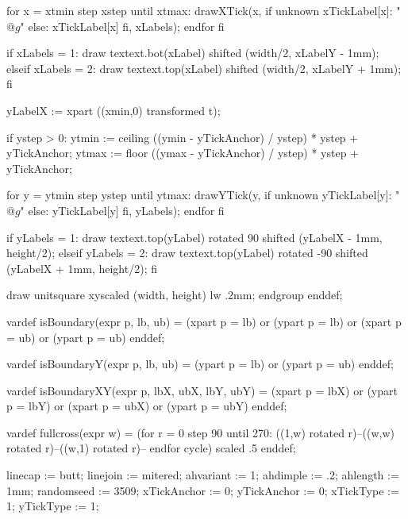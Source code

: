     for x = xtmin step xstep until xtmax:
      drawXTick(x, if unknown xTickLabel[x]: "$@g$" else: xTickLabel[x] fi, xLabels);
    endfor
  fi

  if xLabels = 1:
    draw textext.bot(xLabel) shifted (width/2, xLabelY - 1mm);
  elseif xLabels = 2:
    draw textext.top(xLabel) shifted (width/2, xLabelY + 1mm);
  fi

  yLabelX := xpart ((xmin,0) transformed t);

  if ystep > 0:
    ytmin := ceiling ((ymin - yTickAnchor) / ystep) * ystep + yTickAnchor;
    ytmax := floor ((ymax - yTickAnchor) / ystep) * ystep + yTickAnchor;

    for y = ytmin step ystep until ytmax:
      drawYTick(y, if unknown yTickLabel[y]: "$@g$" else: yTickLabel[y] fi, yLabels);
    endfor
  fi

  if yLabels = 1:
    draw textext.top(yLabel) rotated 90 shifted (yLabelX - 1mm, height/2);
  elseif yLabels = 2:
    draw textext.top(yLabel) rotated -90 shifted (yLabelX + 1mm, height/2);
  fi

  draw unitsquare xyscaled (width, height) lw .2mm;
endgroup enddef;

vardef isBoundary(expr p, lb, ub) =
  (xpart p = lb) or (ypart p = lb) or (xpart p = ub) or (ypart p = ub)
enddef;

vardef isBoundaryY(expr p, lb, ub) =
  (ypart p = lb) or (ypart p = ub)
enddef;

vardef isBoundaryXY(expr p, lbX, ubX, lbY, ubY) =
  (xpart p = lbX) or (ypart p = lbY) or (xpart p = ubX) or (ypart p = ubY)
enddef;

vardef fullcross(expr w) =
  (for r = 0 step 90 until 270:
    ((1,w) rotated r)--((w,w) rotated r)--((w,1) rotated r)--
  endfor cycle) scaled .5
enddef;
\stopMPdefinitions

\startMPinitializations
linecap := butt;
linejoin := mitered;
ahvariant := 1;
ahdimple := .2;
ahlength := 1mm;
randomseed := 3509;
xTickAnchor := 0;
yTickAnchor := 0;
xTickType := 1; %
yTickType := 1;
\stopMPinitializations

\stopenvironment
